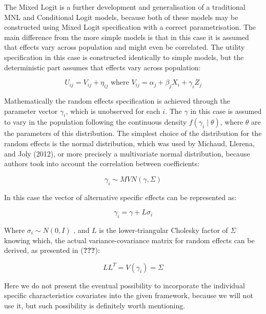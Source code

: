 \documentclass[11pt,]{article}
\begin{document}
The Mixed Logit is a further development and generalisation of a
traditional MNL and Conditional Logit models, because both of these
models may be constructed using Mixed Logit specification with a correct
parametrisation. The main difference from the more simple models is that
in this case it is assumed that effects vary across population and might
even be correlated. The utility specification in this case is
constructed identically to simple models, but the deterministic part
assumes that effects vary across population:

\begin{equation}
U_{ij} = V_{ij} + \eta_{ij} \text{ where } V_{ij} = \alpha_j + \beta_j X_i + \gamma_i Z_j
\end{equation}

Mathematically the random effects specification is achieved through the
parameter vector \(\gamma_i\), which is unobserved for each \(i\). The
\(\gamma\) in this case is assumed to vary in the population following
the continuous density \(f(\gamma_i \mid \theta)\), where \(\theta\) are
the parameters of this distribution. The simplest choice of the
distribution for the random effects is the normal distribution, which
was used by Michaud, Llerena, and Joly (2012), or more precisely a
multivariate normal distribution, because authors took into account the
correlation between coefficients:

\begin{equation}
\gamma_i \sim MVN(\gamma, \Sigma)
\end{equation}

In this case the vector of alternative specific effects can be
represented as:

\begin{equation}
\gamma_i = \gamma + L \sigma_i
\end{equation}

Where \(\sigma_i \sim N(0, I)\) , and \(L\) is the lower-triangular
Cholesky factor of \(\Sigma\) knowing which, the actual
variance-covariance matrix for random effects can be derived, as
presented in ({\textbf{???}}):

\begin{equation}
LL^T = V(\gamma_i) = \Sigma
\end{equation}

Here we do not present the eventual possibility to incorporate the
individual specific characteristics covariates into the given framework,
because we will not use it, but such possibility is definitely worth
mentioning.
\end{document}
